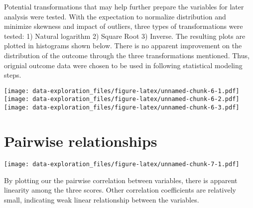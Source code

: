 \documentclass[
  12pt,
]{article}
\begin{document}
Potential transformations that may help further prepare the variables
for later analysis were tested. With the expectation to normalize
distribution and minimize skewness and impact of outliers, three types
of transformations were tested: 1) Natural logarithm 2) Square Root 3)
Inverse. The resulting plots are plotted in histograms shown below.
There is no apparent improvement on the distribution of the outcome
through the three transformations mentioned. Thus, orignial outcome data
were chosen to be used in following statistical modeling steps.

\texttt{[image: data-exploration\_files/figure-latex/unnamed-chunk-6-1.pdf]}
\texttt{[image: data-exploration\_files/figure-latex/unnamed-chunk-6-2.pdf]}
\texttt{[image: data-exploration\_files/figure-latex/unnamed-chunk-6-3.pdf]}

\hypertarget{pairwise-relationships}{%
\section{Pairwise relationships}\label{pairwise-relationships}}

\texttt{[image: data-exploration\_files/figure-latex/unnamed-chunk-7-1.pdf]}

By plotting our the pairwise correlation between variables, there is
apparent linearity among the three scores. Other correlation
coefficients are relatively small, indicating weak linear relationship
between the variables.
\end{document}
